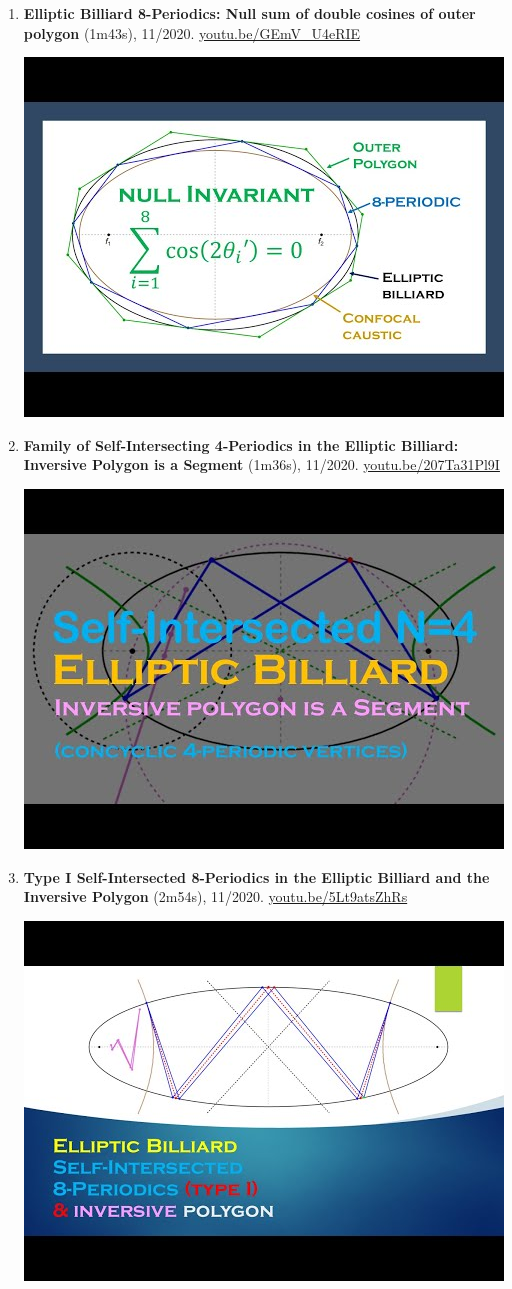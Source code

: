\documentclass[12pt]{article}
\begin{document}
\begin{enumerate}[resume]
% 
\item \textbf{Elliptic Billiard 8-Periodics: Null sum of double cosines of outer polygon} (1m43s), 11/2020. \href{https://youtu.be/GEmV_U4eRIE}{\url{youtu.be/GEmV\_U4eRIE}}
\begin{center}\includegraphics[width=.5\textwidth]{pics/GEmV_U4eRIE.jpg}\end{center}
% 
\item \textbf{Family of Self-Intersecting 4-Periodics in the Elliptic Billiard: Inversive Polygon is a Segment} (1m36s), 11/2020. \href{https://youtu.be/207Ta31Pl9I}{\url{youtu.be/207Ta31Pl9I}}
\begin{center}\includegraphics[width=.5\textwidth]{pics/207Ta31Pl9I.jpg}\end{center}
% 
\item \textbf{Type I Self-Intersected 8-Periodics in the Elliptic Billiard and the Inversive Polygon} (2m54s), 11/2020. \href{https://youtu.be/5Lt9atsZhRs}{\url{youtu.be/5Lt9atsZhRs}}
\begin{center}\includegraphics[width=.5\textwidth]{pics/5Lt9atsZhRs.jpg}\end{center}

\end{enumerate}
\end{document}
